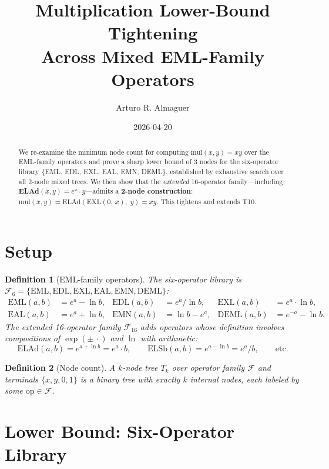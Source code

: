\documentclass[11pt]{article}
\title{Multiplication Lower-Bound Tightening\\
       Across Mixed EML-Family Operators}
\author{Arturo R. Almaguer}
\date{2026-04-20}
\newtheorem{definition}{Definition}
\begin{document}
\maketitle

\begin{abstract}
We re-examine the minimum node count for computing $\text{mul}(x,y) = xy$ over
the EML-family operators and prove a sharp lower bound of 3 nodes for the
six-operator library $\{$EML, EDL, EXL, EAL, EMN, DEML$\}$, established by
exhaustive search over all 2-node mixed trees.  We then show that the
\emph{extended} 16-operator family---including \textbf{ELAd}$(x,y) =
e^x \cdot y$---admits a \textbf{2-node construction}:
$\text{mul}(x,y) = \text{ELAd}(\text{EXL}(0,\,x),\; y) = xy$.
This tightens and extends T10.
\end{abstract}

\section{Setup}

\begin{definition}[EML-family operators]
The \emph{six-operator library} is $\mathcal{F}_6 = \{\mathrm{EML}, \mathrm{EDL},
\mathrm{EXL}, \mathrm{EAL}, \mathrm{EMN}, \mathrm{DEML}\}$:
\begin{align*}
\mathrm{EML}(a,b) &= e^a - \ln b, &
\mathrm{EDL}(a,b) &= e^a / \ln b, &
\mathrm{EXL}(a,b) &= e^a \cdot \ln b, \\
\mathrm{EAL}(a,b) &= e^a + \ln b, &
\mathrm{EMN}(a,b) &= \ln b - e^a, &
\mathrm{DEML}(a,b) &= e^{-a} - \ln b.
\end{align*}
The \emph{extended 16-operator family} $\mathcal{F}_{16}$ adds operators whose
definition involves compositions of $\exp(\pm\,\cdot)$ and $\ln$ with arithmetic:
\[
\mathrm{ELAd}(a,b) = e^{a+\ln b} = e^a \cdot b, \qquad
\mathrm{ELSb}(a,b) = e^{a-\ln b} = e^a / b, \qquad
\text{etc.}
\]
\end{definition}

\begin{definition}[Node count]
A \emph{$k$-node tree} $T_k$ over operator family $\mathcal{F}$ and
terminals $\{x, y, 0, 1\}$ is a binary tree with exactly $k$ internal nodes,
each labeled by some $\mathrm{op} \in \mathcal{F}$.
\end{definition}

\section{Lower Bound: Six-Operator Library}
\end{document}

